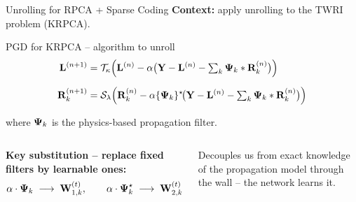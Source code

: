 \begin{frame}{Unrolling for RPCA + Sparse Coding}
  \textbf{Context:} apply unrolling to the TWRI problem (KRPCA).

  \vspace{0.4em}
  \begin{shibuiframe}{PGD for KRPCA -- algorithm to unroll}
    \begin{align*}
      \mathbf{L}^{(n+1)}
        &= \mathcal{T}_{\kappa}\!\left(
             \mathbf{L}^{(n)}
             - \alpha\bigl(
                 \mathbf{Y}
                 - \mathbf{L}^{(n)}
                 - \textstyle\sum_{k}
                   \boldsymbol{\Psi}_{k}\ast\mathbf{R}_{k}^{(n)}
               \bigr)
           \right)
      \\[6pt]
      \mathbf{R}_{k}^{(n+1)}
        &= \mathcal{S}_{\lambda}\!\left(
             \mathbf{R}_{k}^{(n)}
             - \alpha
               \{\boldsymbol{\Psi}_{k}\}^{\star}\!
               \bigl(
                 \mathbf{Y}
                 - \mathbf{L}^{(n)}
                 - \textstyle\sum_{k}
                   \boldsymbol{\Psi}_{k}\ast\mathbf{R}_{k}^{(n)}
               \bigr)
           \right)
    \end{align*}
  \end{shibuiframe}

  \vspace{0.3em}
  where $\boldsymbol{\Psi}_{k}$ is the physics-based propagation filter.

  \vspace{0.5em}
  \begin{columns}[T]
      \textbf{Key substitution -- replace fixed filters by
      learnable ones:}
      \[
        \alpha\cdot\boldsymbol{\Psi}_{k}
          \;\longrightarrow\;
          \mathbf{W}_{1,k}^{(t)},
        \qquad
        \alpha\cdot\boldsymbol{\Psi}_{k}^{\star}
          \;\longrightarrow\;
          \mathbf{W}_{2,k}^{(t)}
      \]

      \begin{shibiunote}[Benefit]
        Decouples us from exact knowledge
        of the propagation model through
        the wall -- the network learns it.
      \end{shibiunote}
  \end{columns}
\end{frame}

